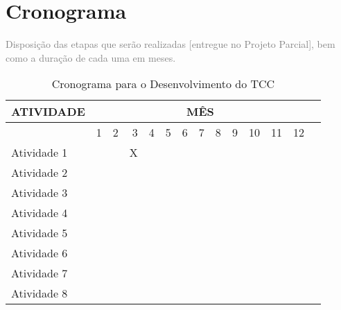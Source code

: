 \section{Cronograma}
\textcolor{gray}{Disposição das etapas que serão realizadas [entregue no Projeto Parcial], bem como a duração de cada uma em meses.} 

\begin{table}[!htp]\centering
\caption{Cronograma para o Desenvolvimento do TCC}\label{tab: }
\scriptsize
\begin{tabular}{lr|r|r|r|r|r|r|r|r|r|r|rr}\toprule
\multirow{2}{*}{\textbf{ATIVIDADE}} &\multicolumn{12}{c}{\textbf{MÊS}} \\\midrule
&1 &2 &3 &4 &5 &6 &7 &8 &9 &10 &11 &12 \\
Atividade 1 & & & X & & & & & & & \\
Atividade 2 & & & & & & & & & & & \\
Atividade 3 & & & & & & & & & & & \\
Atividade 4 & & & & & & & & & & & \\
Atividade 5 & & & & & & & & & & & \\
Atividade 6 & & & & & & & & & & & \\
Atividade 7 & & & & & & & & & & & \\
Atividade 8 & & & & & & & & & & & \\
\bottomrule
\end{tabular}
\end{table}